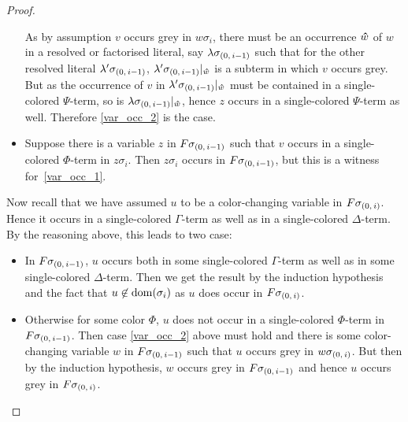 \documentclass[,%
	draft=false,%
	numbers=noendperiod
	12pt,
	a4paper,
	oneside,%
	openany,
]{memoir}
\begin{document}
\begin{proof}
\begin{itemize}
			As by assumption $v$ occurs grey in $w\sigma_i$, there must be an occurrence $\bm\hat w$ of $w$ in a resolved or factorised literal, say $\lambda\sigma_{(0,\,i-1)}$ such that for the other resolved literal $\lambda'\sigma_{(0,\,i-1)}$, $\lambda'\sigma_{(0,\,i-1)}|_{\bm\hat w}$ is a subterm in which $v$ occurs grey.
			But as the occurrence of $v$ in $\lambda'\sigma_{(0,\,i-1)}|_{\bm\hat w}$ must be contained in a single-colored $\Psi$-term, so is $\lambda\sigma_{(0,\,i-1)}|_{\bm\hat w}$, hence $z$ occurs in a single-colored $\Psi$-term as well.
			Therefore \ref{var_occ_2} is the case.

		\item
			Suppose there is a variable $z$ in $F\sigma_{(0,\,i-1)}$ such that $v$ occurs in a single-colored $\Phi$-term in $z\sigma_i$.
			Then $z\sigma_i$ occurs in $F\sigma_{(0,\,i-1)}$, but this is a witness for~\ref{var_occ_1}.
	\end{itemize}

	Now recall that we have assumed $u$ to be a color-changing variable in $F\sigma_{(0,\,i)}$.
	Hence it occurs in a single-colored $\Gamma$-term as well as in a single-colored $\Delta$-term.
	By the reasoning above, this leads to two case:
	\begin{itemize}
		\item In $F\sigma_{(0,\,i-1)}$, $u$ occurs both in some single-colored $\Gamma$-term as well as in some single-colored $\Delta$-term.
			Then we get the result by the induction hypothesis and the fact that $u\not\in\operatorname{dom}(\sigma_i)$ as $u$ does occur in $F\sigma_{(0,\,i)}$.
		\item Otherwise for some color $\Phi$, $u$ does not occur in a single-colored $\Phi$-term in $F\sigma_{(0,\,i-1)}$.
			Then case \ref{var_occ_2} above must hold and there is some color-changing variable $w$ in $F\sigma_{(0,\,i-1)}$ such that $u$ occurs grey in $w\sigma_{(0,\,i)}$.
			But then by the induction hypothesis, $w$ occurs grey in $F\sigma_{(0,\,i-1)}$ and hence $u$ occurs grey in $F\sigma_{(0,\,i)}$.
			\qedhere
	\end{itemize}
\end{proof}

~
\end{document}
